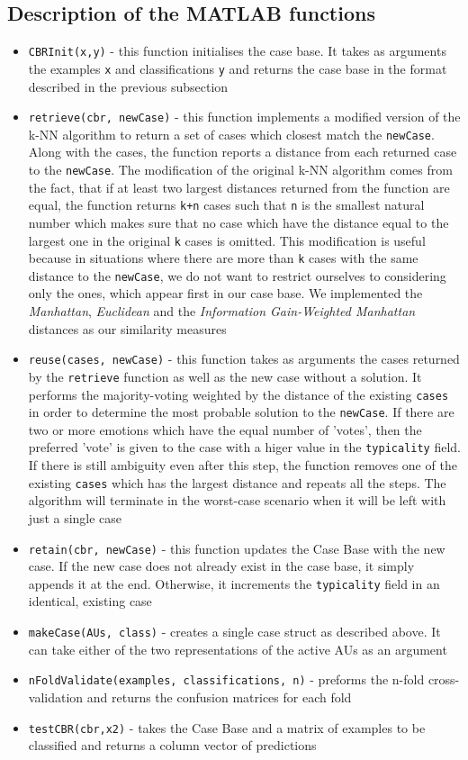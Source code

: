\documentclass[a4paper]{article}
\begin{document}
\subsection{Description of the MATLAB functions}
\begin{itemize}
\item \texttt{CBRInit(x,y)} - this function initialises the case base. It takes as arguments the examples \texttt{x} and classifications \texttt{y} and returns the case base in the format described in the previous subsection
\item \texttt{retrieve(cbr, newCase)} - this function implements a modified version of the k-NN algorithm to return a set of cases which closest match the \texttt{newCase}. Along with the cases, the function reports a distance from each returned case to the \texttt{newCase}. The modification of the original k-NN algorithm comes from the fact, that if at least two largest distances returned from the function are equal, the function returns \texttt{k+n} cases such that \texttt{n} is the smallest natural number which makes sure that no case which have the distance equal to the largest one in the original \texttt{k} cases is omitted. This modification is useful because in situations where there are more than \texttt{k} cases with the same distance to the \texttt{newCase}, we do not want to restrict ourselves to considering only the ones, which appear first in our case base. We implemented the \emph{Manhattan}, \emph{Euclidean} and the \emph{Information Gain-Weighted Manhattan} distances as our similarity measures
\item \texttt{reuse(cases, newCase)} - this function takes as arguments the cases returned by the \texttt{retrieve} function as well as the new case without a solution. It performs the majority-voting weighted by the distance of the existing \texttt{cases} in order to determine the most probable solution to the \texttt{newCase}. If there are two or more emotions which have the equal number of 'votes', then the preferred 'vote' is given to the case with a higer value in the \texttt{typicality} field. If there is still ambiguity even after this step, the function removes one of the existing \texttt{cases} which has the largest distance and repeats all the steps. The algorithm will terminate in the worst-case scenario when it will be left with just a single case
\item \texttt{retain(cbr, newCase)} - this function updates the Case Base with the new case. If the new case does not already exist in the case base, it simply appends it at the end. Otherwise, it increments the \texttt{typicality} field in an identical, existing case
\item \texttt{makeCase(AUs, class)} - creates a single case struct as described above. It can take either of the two representations of the active AUs as an argument
\item \texttt{nFoldValidate(examples, classifications, n)} - preforms the n-fold cross-validation and returns the confusion matrices for each fold
\item \texttt{testCBR(cbr,x2)} - takes the Case Base and a matrix of examples to be classified and returns a column vector of predictions
\end{itemize}
\clearpage
\end{document}
